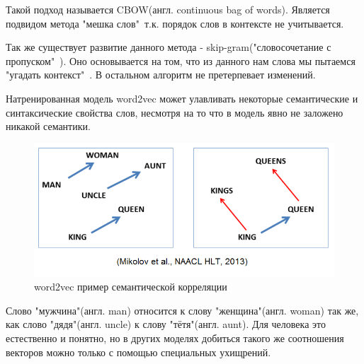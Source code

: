 Такой подход называется CBOW(англ. continuous bag of words). Является подвидом метода "мешка слов"\ т.к. порядок слов в контексте не учитывается. 

Так же существует развитие данного метода - skip-gram\cite{Book28}("словосочетание с пропуском"\ ). Оно основывается на том, что  из данного нам слова мы пытаемся "угадать контекст"\ . В остальном алгоритм не претерпевает изменений.

Натренированная модель word2vec может улавливать некоторые семантические и синтаксические свойства слов, несмотря на то что в модель явно не заложено никакой семантики.
\begin{figure}[!h]
	\centering
	\includegraphics[width=.5\textwidth]{master_img/word2vec_example.png}
	\caption{word2vec пример семантической корреляции\cite{Book28}}
	\label{fig04_master}
\end{figure}
Слово "мужчина"(англ. man) относится к слову "женщина"(англ. woman) так же, как слово "дядя"(англ. uncle) к слову "тётя"(англ. aunt). Для человека это естественно и понятно, но в других моделях добиться такого же соотношения векторов можно только с помощью специальных ухищрений.
